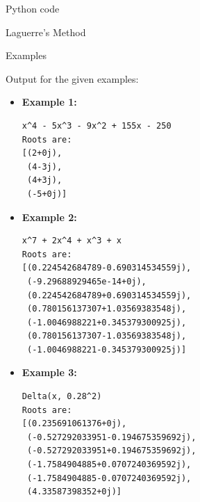 \documentclass[11pt, a4paper, english, twoside, notitlepage, openright]{report}
\begin{document}
\begin{chapter}{Python code}\label{BB}
\begin{section}{Laguerre's Method}\label{lagSec}
\end{section}

\begin{section}{Examples}\label{exLagSec}

\begin{center}
\end{center}

\vspace{0.4cm}
Output for the given examples:

\begin{itemize}
\item \textbf{Example 1: }
\begin{lstlisting}[frame=tbrl]
x^4 - 5x^3 - 9x^2 + 155x - 250
Roots are:
[(2+0j),
 (4-3j),
 (4+3j),
 (-5+0j)] 
\end{lstlisting}
\item \textbf{Example 2:}
\begin{lstlisting}[frame=tbrl]
x^7 + 2x^4 + x^3 + x
Roots are:
[(0.224542684789-0.690314534559j),
 (-9.29688929465e-14+0j),
 (0.224542684789+0.690314534559j),
 (0.780156137307+1.03569383548j),
 (-1.0046988221+0.345379300925j),
 (0.780156137307-1.03569383548j),
 (-1.0046988221-0.345379300925j)] 
\end{lstlisting}
\item	 \textbf{Example 3:}
\begin{lstlisting}[frame=tbrl]
Delta(x, 0.28^2)
Roots are:
[(0.235691061376+0j),
 (-0.527292033951-0.194675359692j),
 (-0.527292033951+0.194675359692j),
 (-1.7584904885+0.0707240369592j),
 (-1.7584904885-0.0707240369592j),
 (4.33587398352+0j)] 
\end{lstlisting}
\end{itemize}

\end{section}

\end{chapter}
\end{document}
